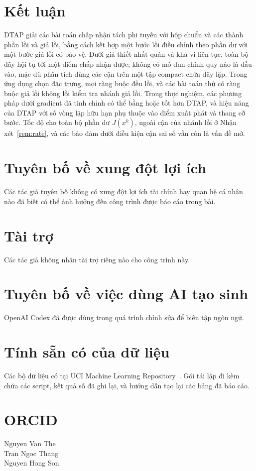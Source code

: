 \documentclass[]{interact}
\theoremstyle{plain}
\theoremstyle{definition}
\theoremstyle{remark}
\begin{document}
\section{Kết luận}\label{sec:conclusion}
DTAP giải các bài toán chấp nhận tách phi tuyến với hộp chuẩn và các thành phần lồi và giả lồi, bằng cách kết hợp một bước lồi điều chỉnh theo phần dư với một bước giả lồi có bảo vệ. Dưới giả thiết nhất quán và khả vi liên tục, toàn bộ dãy hội tụ tới một điểm chấp nhận được; không có mô-đun chính quy nào là đầu vào, mặc dù phân tích dùng các cận trên một tập compact chứa dãy lặp. Trong ứng dụng chọn đặc trưng, mọi ràng buộc đều lồi, và các bài toán thử có ràng buộc giả lồi không lồi kiểm tra nhánh giả lồi. Trong thực nghiệm, các phương pháp dưới gradient đã tinh chỉnh có thể bằng hoặc tốt hơn DTAP, và hiệu năng của DTAP với số vòng lặp hữu hạn phụ thuộc vào điểm xuất phát và thang cỡ bước. Tốc độ cho toàn bộ phần dư $J(x^k)$, ngoài cận của nhánh lồi ở Nhận xét~\ref{rem:rate}, và các bảo đảm dưới điều kiện cận sai số vẫn còn là vấn đề mở.

\section*{Tuyên bố về xung đột lợi ích}
Các tác giả tuyên bố không có xung đột lợi ích tài chính hay quan hệ cá nhân nào đã biết có thể ảnh hưởng đến công trình được báo cáo trong bài.
\section*{Tài trợ}
Các tác giả không nhận tài trợ riêng nào cho công trình này.
\section*{Tuyên bố về việc dùng AI tạo sinh}
OpenAI Codex đã được dùng trong quá trình chỉnh sửa để biên tập ngôn ngữ.
\section*{Tính sẵn có của dữ liệu}
Các bộ dữ liệu có tại UCI Machine Learning Repository~\citep{kelly2023uci}. Gói tái lập đi kèm chứa các script, kết quả số đã ghi lại, và hướng dẫn tạo lại các bảng đã báo cáo.

\section*{ORCID}
\noindent Nguyen Van The~\\
Tran Ngoc Thang~\\
Nguyen Hong Son~
\end{document}
